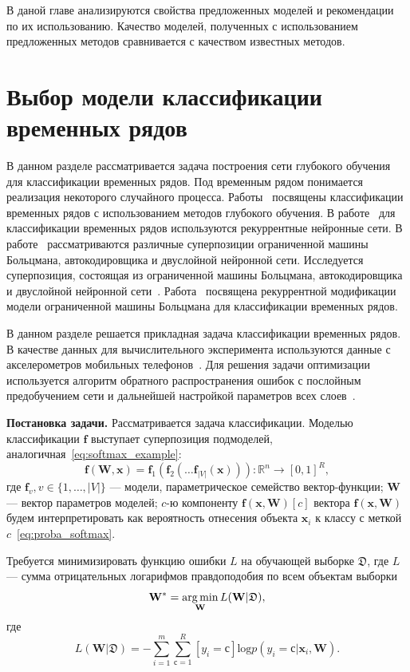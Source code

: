 В даной главе анализируются свойства предложенных моделей и рекомендации по их использованию. Качество моделей, полученных с использованием предложенных методов сравнивается с качеством
известных методов.
\section{Выбор модели классификации временных рядов}

В данном разделе рассматривается задача построения сети глубокого обучения для классификации временных рядов. Под временным рядом понимается реализация некоторого случайного процесса.  Работы~\cite{ts1,ts2,ts3} посвящены классификации временных рядов с использованием методов глубокого обучения. В работе~\cite{ts2}  для классификации временных рядов  используются рекуррентные нейронные сети. В работе~\cite{ts3} рассматриваются различные суперпозиции ограниченной машины Больцмана, автокодировщика и двуслойной нейронной сети. Исследуется суперпозиция, состоящая из ограниченной машины Больцмана, автокодировщика и двуслойной нейронной сети~\cite{founds}. Работа~\cite{recrbm} посвящена рекуррентной модификации модели ограниченной машины Больцмана для классификации временных рядов. 

В данном разделе решается прикладная задача классификации временных рядов. В качестве данных для вычислительного эксперимента используются данные с акселерометров мобильных телефонов~\cite{wisdm}. Для решения задачи оптимизации используется алгоритм обратного распространения ошибок с послойным предобучением сети и дальнейшей настройкой параметров всех слоев~\cite{finetuning}.

\textbf{Постановка задачи. }
Рассматривается задача классификации. 
Моделью классификации  $\mathbf{f}$ выступает суперпозиция подмоделей, аналогичная~\eqref{eq:softmax_example}:
\begin{equation}
\label{eq:wisdm_superposition}
 \mathbf{f}(\mathbf{W}, \mathbf{x}) = \mathbf{f}_1(\mathbf{f}_2(\dots \mathbf{f}_{|V|}(\mathbf{x}))): \mathbb{R}^n \to [0,1]^R,
\end{equation}
где $\mathbf{f}_v, v \in \{1,\dots,{|V|}\}$ --- модели, параметрическое семейство вектор-функции; $\mathbf{W}$ --- вектор параметров моделей;
$c$-ю компоненту $\mathbf{f}(\mathbf{x}, \mathbf{W})[c]$ вектора $\mathbf{f}(\mathbf{x},\mathbf{W})$ будем интерпретировать как вероятность отнесения объекта $\mathbf{x}_i$ к классу с меткой $c$~\eqref{eq:proba_softmax}.

Требуется минимизировать функцию ошибки $L$ на обучающей выборке $\mathfrak{D}$,
где $L$ --- сумма отрицательных логарифмов правдоподобия по всем объектам выборки
\[
\mathbf{W}^{*} = \operatorname*{arg\,min}_\mathbf{W} L(\mathbf{W}|\mathfrak{D}),
\]
где
\[
 L(\mathbf{W}|\mathfrak{D}) = -\sum_{i=1}^m \sum_{с=1}^R [y_i = с] \text{log} p(y_i=с|\mathbf{x}_i,\mathbf{W}).
\]

